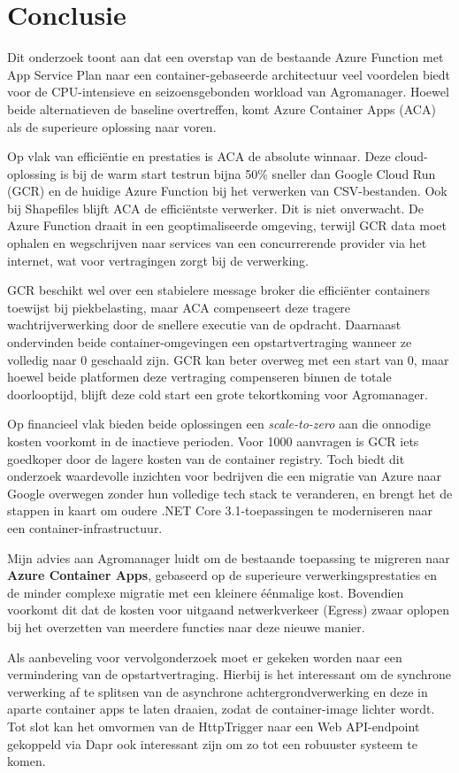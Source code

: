 
\chapter{Conclusie}%
\label{ch:conclusie}

Dit onderzoek toont aan dat een overstap van de bestaande Azure Function met App Service Plan naar een container-gebaseerde architectuur veel voordelen biedt voor de CPU-intensieve en seizoensgebonden workload van Agromanager. Hoewel beide alternatieven de baseline overtreffen, komt Azure Container Apps (ACA) als de superieure oplossing naar voren.

Op vlak van efficiëntie en prestaties is ACA de absolute winnaar. Deze cloud-oplossing is bij de warm start testrun bijna 50\% sneller dan Google Cloud Run (GCR) en de huidige Azure Function bij het verwerken van CSV-bestanden. Ook bij Shapefiles blijft ACA de efficiëntste verwerker. Dit is niet onverwacht. De Azure Function draait in een geoptimaliseerde omgeving, terwijl GCR data moet ophalen en wegschrijven naar services van een concurrerende provider via het internet, wat voor vertragingen zorgt bij de verwerking.

GCR beschikt wel over een stabielere message broker die efficiënter containers toewijst bij piekbelasting, maar ACA compenseert deze tragere wachtrijverwerking door de snellere executie van de opdracht. Daarnaast ondervinden beide container-omgevingen een opstartvertraging wanneer ze volledig naar 0 geschaald zijn. GCR kan beter overweg met een start van 0, maar hoewel beide platformen deze vertraging compenseren binnen de totale doorlooptijd, blijft deze cold start een grote tekortkoming voor Agromanager.

Op financieel vlak bieden beide oplossingen een \textit{scale-to-zero} aan die onnodige kosten voorkomt in de inactieve perioden. Voor 1000 aanvragen is GCR iets goedkoper door de lagere kosten van de container registry. Toch biedt dit onderzoek waardevolle inzichten voor bedrijven die een migratie van Azure naar Google overwegen zonder hun volledige tech stack te veranderen, en brengt het de stappen in kaart om oudere .NET Core 3.1-toepassingen te moderniseren naar een container-infrastructuur.

Mijn advies aan Agromanager luidt om de bestaande toepassing te migreren naar \textbf{Azure Container Apps}, gebaseerd op de superieure verwerkingsprestaties en de minder complexe migratie met een kleinere éénmalige kost. Bovendien voorkomt dit dat de kosten voor uitgaand netwerkverkeer (Egress) zwaar oplopen bij het overzetten van meerdere functies naar deze nieuwe manier.

Als aanbeveling voor vervolgonderzoek moet er gekeken worden naar een vermindering van de opstartvertraging. Hierbij is het interessant om de synchrone verwerking af te splitsen van de asynchrone achtergrondverwerking en deze in aparte container apps te laten draaien, zodat de container-image lichter wordt. Tot slot kan het omvormen van de HttpTrigger naar een Web API-endpoint gekoppeld via Dapr ook interessant zijn om zo tot een robuuster systeem te komen.